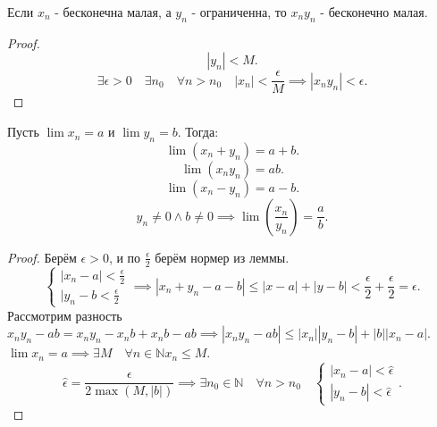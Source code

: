 \documentclass[11pt, oneside]{article}   	%
\begin{document}
        \begin{dlemma}
            Если $x_n$ - бесконечна малая, а  $y_n$ - ограниченна, то  $x_ny_n$ - бесконечно малая.
             \begin{proof}
                 \[ |y_n| < M .\]
                 \[ \exists{\epsilon > 0}\quad \exists{n_0}\quad \forall{n > n_0}\quad |x_n| < \frac{\epsilon}{M} \implies |x_ny_n| < \epsilon .\] 
            \end{proof}
        \end{dlemma}
        \begin{theorem}
            Пусть $\lim x_n=a$ и  $\lim y_n = b$. Тогда:
            \[ \lim \left( x_n+y_n \right) =a+b .\]
            \[ \lim \left( x_ny_n \right) =ab .\]
            \[ \lim\left( x_n-y_n \right)=a-b  .\]
            \[ y_n \neq 0\land b\neq 0 \implies \lim\left( \frac{x_n}{y_n} \right) = \frac{a}{b} .\]
            \begin{proof}
                Берём $\epsilon > 0$, и по  $\frac{\epsilon}{2}$ берём нормер из леммы.
                \[ 
                    \begin{cases}
                        |x_n-a|<\frac{\epsilon}{2}\\
                        |y_n-b<\frac{\epsilon}{2}
                    \end{cases}
                \implies |x_n+y_n-a-b|\le |x-a|+|y-b|<\frac{\epsilon}{2}+\frac{\epsilon}{2}=\epsilon.\]
            Рассмотрим разность $x_ny_n-ab = x_ny_n-x_nb+x_nb-ab \implies |x_ny_n-ab|\le |x_n| |y_n-b|+|b| |x_n-a|$.\\
            $\lim x_n = a \implies \exists{M}\quad \forall{n \in \mathbb{N}} x_n \le  M$.
            \[ \hat{\epsilon} = \frac{\epsilon}{2\max\left( M, |b| \right) } \implies \exists{n_0 \in \mathbb{N}}\quad \forall{n > n_0}\quad \begin{cases}
                |x_n-a| < \hat{\epsilon}\\
                |y_n-b| < \hat{\epsilon}
            \end{cases}.\] 
            \end{proof} 
        \end{theorem}
\end{document}
